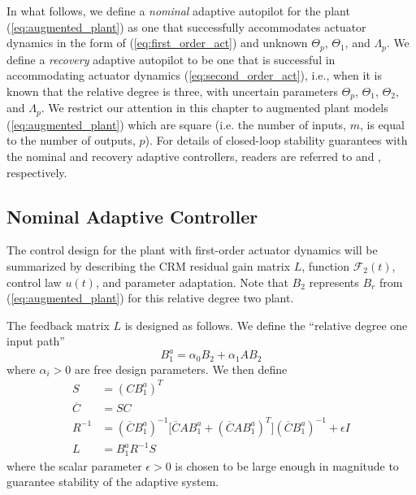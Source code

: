 In what follows, we define a \textit{nominal} adaptive autopilot for the plant (\ref{eq:augmented_plant}) as one that successfully accommodates actuator dynamics in the form of (\ref{eq:first_order_act}) and unknown $\Theta_p$, $\Theta_1$, and $\Lambda_p$. We define a \textit{recovery} adaptive autopilot to be one that is successful in accommodating actuator dynamics (\ref{eq:second_order_act}), i.e., when it is known that the relative degree is three, with uncertain parameters $\Theta_p$, $\Theta_1$, $\Theta_2$, and $\Lambda_p$. We restrict our attention in this chapter to augmented plant models (\ref{eq:augmented_plant}) which are square (i.e. the number of inputs, $m$, is equal to the number of outputs, $p$). For details of closed-loop stability guarantees with the nominal and recovery adaptive controllers, readers are referred to \cite{qu2016adaptive} and \cite{qu2016phd}, respectively.
 
\subsection{Nominal Adaptive Controller}
The control design for the plant with first-order actuator dynamics will be summarized by describing the CRM residual gain matrix $L$, function $\mathcal{F}_2(t)$, control law $u(t)$, and parameter adaptation. Note that $B_2$ represents $B_r$ from (\ref{eq:augmented_plant}) for this relative degree two plant. 

The feedback matrix $L$ is designed as follows. We define the ``relative degree one input path''
\begin{equation}
B_1^a = \alpha_0 B_2 + \alpha_1 A B_2 \label{eq:rd2-b1a}
\end{equation}
where $\alpha_i > 0$ are free design parameters. We then define
\begin{align}
S &= (C B_1^a)^T \label{eq:S}\\	\overline{C} & = S C\\ R^{-1} &= (\overline{C} B_1^a)^{-1} \big[ \overline{C} A B_1^a + (\overline{C} A B_1^a)^T\big] (\overline{C} B_1^a)^{-1} + \epsilon I \\ L & = B_1^a R^{-1} S \label{eq:L}
\end{align}
where the scalar parameter $\epsilon > 0$ \cite[Eq. 30]{qu2015adaptive} is chosen to be large enough in magnitude to guarantee stability of the adaptive system. 

